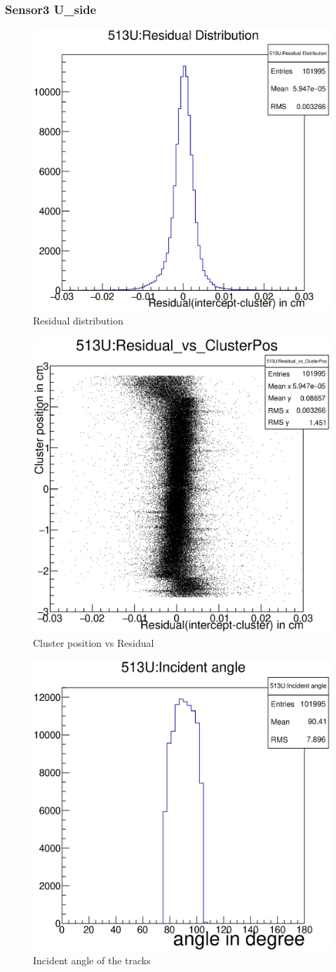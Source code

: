 \documentclass[12pt]{article}
\begin{document}
					\subsubsection{Sensor3 U\_side}
					\begin{multicols}{3}
						
						\begin{figure}[H]
							\includegraphics[width=.3\textwidth]{513U:residualplot.eps}	
							\caption{Residual distribution}	
							\label{fig1}	
						\end{figure}
						\begin{figure}[H]
							\includegraphics[width=.3\textwidth]{513U:residual_vs_clusterpos.eps}	
							\caption{Cluster position vs Residual}	
							\label{fig2}	
						\end{figure}
						\begin{figure}[H]
							\includegraphics[width=.3\textwidth]{513U:incident_angle.eps}	
							\caption{Incident angle of the tracks}	
							\label{fig2}	
						\end{figure}
					\end{multicols}
					
\end{document}
